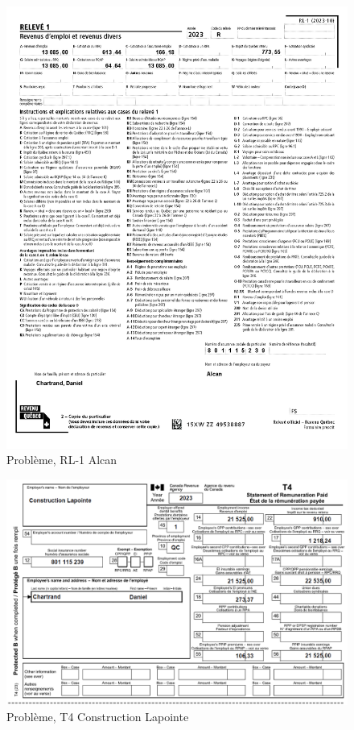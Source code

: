 \begin{figure}
	\centering
	\includegraphics[width=.9\textwidth]{probleme/chapitre-2/RL1-Alcan.png}
	\caption{Problème, RL-1 Alcan}
	\label{fig:pb2RL1Alcan}
\end{figure}

\begin{figure}
	\centering
	\includegraphics[width=.9\textwidth]{probleme/chapitre-2/T4-ConstructionLapointe.png}
	\caption{Problème, T4 Construction Lapointe}
	\label{fig:pb2T4ConstructionLapointe}
\end{figure}


